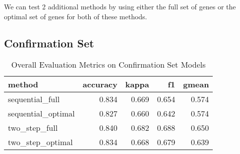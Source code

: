 \documentclass[
]{report}
\begin{document}
We can test 2 additional methods by using either the full set of genes or the optimal set of genes for both of these methods.

\hypertarget{confirmation-set}{%
\subsection{Confirmation Set}\label{confirmation-set}}

\begin{table}

\caption{\label{tab:conf-eval-overall}Overall Evaluation Metrics on Confirmation Set Models}
\centering
\begin{tabular}[t]{l|r|r|r|r}
\hline
method & accuracy & kappa & f1 & gmean\\
\hline
sequential\_full & 0.834 & 0.669 & 0.654 & 0.574\\
\hline
sequential\_optimal & 0.827 & 0.660 & 0.642 & 0.574\\
\hline
two\_step\_full & 0.840 & 0.682 & 0.688 & 0.650\\
\hline
two\_step\_optimal & 0.834 & 0.668 & 0.679 & 0.639\\
\hline
\end{tabular}
\end{table}
\end{document}
